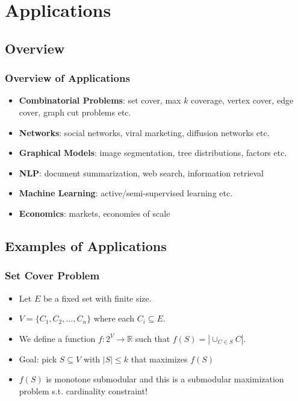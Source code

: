 \documentclass{beamer}
\newcommand{\bbR}{\mathbb{R}}
\begin{document}
\section{Applications}
\subsection{Overview}
\begin{frame}
\frametitle{Overview of Applications}
\begin{itemize}
\item \textbf{Combinatorial Problems}: set cover, max $k$ coverage, vertex cover, edge cover, graph cut problems etc.
\item \textbf{Networks}: social networks, viral marketing, diffusion networks etc.
\item \textbf{Graphical Models}: image segmentation, tree distributions, factors etc.
\item \textbf{NLP}: document summarization, web search, information retrieval
\item \textbf{Machine Learning}: active/semi-supervised learning etc.
\item \textbf{Economics}: markets, economies of scale
\end{itemize}

\end{frame}

\subsection{Examples of Applications}
\begin{frame}
\frametitle{Set Cover Problem}
\begin{itemize}
\item Let $E$ be a fixed set with finite size.
\item $V = \{C_1, C_2, \ldots, C_n\}$ where each $C_i \subseteq E$.
\item  We define a function $f:2^V \rightarrow \bbR$ such that $f(S) = |\cup_{C\in S} C|$.
\item Goal: pick $S \subseteq V$ with $|S| \leq k$ that maximizes $f(S)$
\item $f(S)$ is monotone submodular and this is a submodular maximization problem s.t. cardinality constraint!
\end{itemize}

\end{frame}
\end{document}
